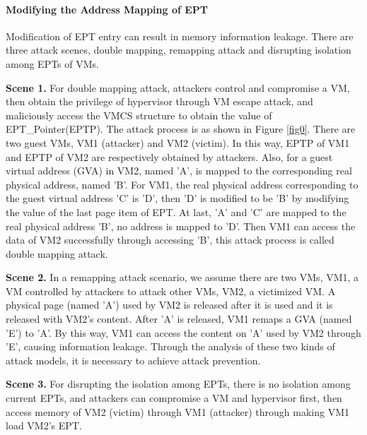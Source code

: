 \documentclass[conference]{IEEEtran}
\begin{document}
\paragraph{Modifying the Address Mapping of EPT}
Modification of EPT entry can result in memory information leakage. There are three attack scenes, double mapping, remapping attack and disrupting isolation among EPTs of VMs.

\textbf{Scene 1.} 
    For double mapping attack, attackers control and compromise a VM, then obtain the privilege of hypervisor through VM escape attack, and maliciously access the VMCS structure to obtain the value of EPT\_Pointer(EPTP). The attack process is as shown in Figure \ref{fig0}. There are two guest VMs, VM1 (attacker) and VM2 (victim). In this way, EPTP of VM1 and EPTP of VM2 are respectively obtained by attackers. Also, for a guest virtual address (GVA) in VM2, named 'A', is mapped to the corresponding real physical address, named 'B'. For VM1, the real physical address corresponding to the guest virtual address 'C' is 'D', then 'D' is modified to be 'B' by modifying the value of the last page item of EPT. At last, 'A' and 'C' are mapped to the real physical address 'B', no address is mapped to 'D'. Then VM1 can access the data of VM2 successfully through accessing 'B', this attack process is called double mapping attack.



\textbf{Scene 2.}
    In a remapping attack scenario, we assume there are two VMs, VM1, a VM controlled by attackers to attack other VMs, VM2, a victimized VM.
 A physical page (named 'A') used by VM2 is released after it is used and it is released with VM2's content. After 'A' is released, VM1 remaps a GVA (named 'E') to 'A'. By this way, VM1 can access the content on 'A' used by VM2 through 'E', causing information leakage.
Through the analysis of these two kinds of attack models, it is necessary to achieve attack prevention.

\textbf{Scene 3.}
 For disrupting the isolation among EPTs, there is no isolation among current EPTs, and attackers can compromise a VM and hypervisor first, then access memory of VM2 (victim) through VM1 (attacker) through making VM1 load VM2's EPT.

\end{document}
